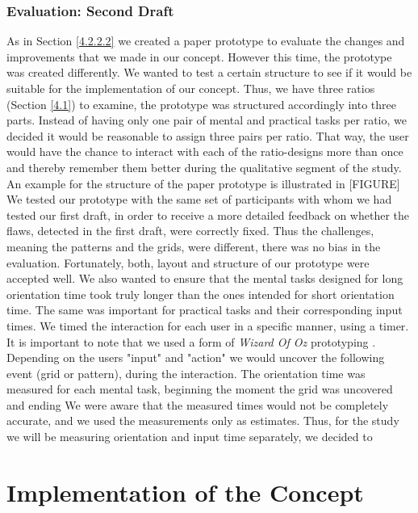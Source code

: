 \subsubsection{Evaluation: Second Draft}

As in Section \ref{4.2.2.2} we created a paper prototype to evaluate the changes and improvements that we made in our concept. However this time, the prototype was created differently. We wanted to test a certain structure to see if it would be suitable for the implementation of our concept. Thus, we have three ratios (Section \ref{4.1}) to examine, the prototype was structured accordingly into three parts. Instead of having only one pair of mental and practical tasks per ratio, we decided it would be reasonable to assign three pairs per ratio. That way, the user would have the chance to interact with each of the ratio-designs more than once and thereby remember them better during the qualitative segment of the study. An example for the structure of the paper prototype is illustrated in [FIGURE] \\

We tested our prototype with the same set of participants with whom we had tested our first draft, in order to receive a more detailed feedback on whether the flaws, detected in the first draft, were correctly fixed. Thus the challenges, meaning the patterns and the grids, were different, there was no bias in the evaluation. Fortunately, both, layout and structure of our prototype were accepted well. We also wanted to ensure that the mental tasks designed for long orientation time took truly longer than the ones intended for short orientation time. The same was important for practical tasks and their corresponding input times. We timed the interaction for each user in a specific manner, using a timer. It is important to note that we used a form of \textit{Wizard Of Oz} prototyping \cite{Butz2014}. Depending on the users "input" and "action" we would uncover the following event (grid or pattern), during the interaction. The orientation time was measured for each mental task, beginning the moment the grid was uncovered and ending  We were aware that the measured times would not be completely accurate, and we used the measurements only as estimates. Thus, for the study we will be measuring orientation and input time separately, we decided to 






\section{Implementation of the Concept}

